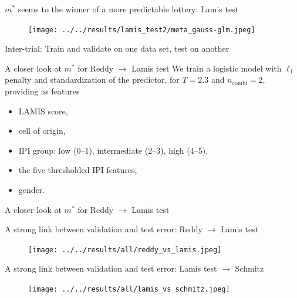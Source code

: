 \documentclass[10pt, aspectratio=169]{beamer}
\begin{document}
\begin{frame}{$m^*$ seems to the winner of a more predictable lottery: Lamis test}
  \begin{figure}[h]
    \centering
    \texttt{[image: ../../results/lamis\_test2/meta\_gauss-glm.jpeg]}
  \end{figure}
\end{frame}

\begin{frame}{Inter-trial: Train and validate on one data set, test on another}
  
\end{frame}

\begin{frame}{A closer look at $m^*$ for Reddy $\to$ Lamis test}
  We train a logistic model with $\ell_1$ penalty and standardization of 
  the predictor, for $T = \num{2.3}$ and 
  $n_\text{combi} = 2$, providing as features
  \begin{itemize}
    \item LAMIS score,
    \item cell of origin,
    \item IPI group: low (0--1), intermediate (2--3), high (4--5),
    \item the five thresholded IPI features,
    \item gender.
  \end{itemize}
\end{frame}

\begin{frame}{A closer look at $m^*$ for Reddy $\to$ Lamis test}
  
\end{frame}

\begin{frame}{A strong link between validation and test error: Reddy $\to$ Lamis test}
  \begin{figure}[h]
    \centering
    \texttt{[image: ../../results/all/reddy\_vs\_lamis.jpeg]}
  \end{figure}
\end{frame}

\begin{frame}{A strong link between validation and test error: Lamis test $\to$ Schmitz}
  \begin{figure}[h]
    \centering
    \texttt{[image: ../../results/all/lamis\_vs\_schmitz.jpeg]}
  \end{figure}
\end{frame}
\end{document}
